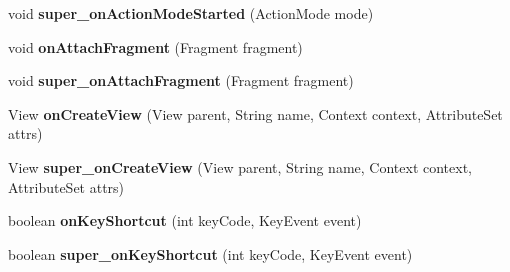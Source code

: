 \begin{DoxyCompactItemize}
\mbox{\label{classorg_1_1qtproject_1_1qt5_1_1android_1_1bindings_1_1_qt_activity_a127cb6e77560fda3f6e3be74982fc85e}} 
void {\bfseries super\+\_\+on\+Action\+Mode\+Started} (Action\+Mode mode)
\item 
\mbox{\label{classorg_1_1qtproject_1_1qt5_1_1android_1_1bindings_1_1_qt_activity_a86beacc61c20b794d08e04df5126ce73}} 
void {\bfseries on\+Attach\+Fragment} (Fragment fragment)
\item 
\mbox{\label{classorg_1_1qtproject_1_1qt5_1_1android_1_1bindings_1_1_qt_activity_a632a2f4f0956a22677fb3c63050295c4}} 
void {\bfseries super\+\_\+on\+Attach\+Fragment} (Fragment fragment)
\item 
\mbox{\label{classorg_1_1qtproject_1_1qt5_1_1android_1_1bindings_1_1_qt_activity_a46b12d20173b9aea5c172e844ace4a70}} 
View {\bfseries on\+Create\+View} (View parent, String name, Context context, Attribute\+Set attrs)
\item 
\mbox{\label{classorg_1_1qtproject_1_1qt5_1_1android_1_1bindings_1_1_qt_activity_a041dac94cc5b7632662d6077fab209b0}} 
View {\bfseries super\+\_\+on\+Create\+View} (View parent, String name, Context context, Attribute\+Set attrs)
\item 
\mbox{\label{classorg_1_1qtproject_1_1qt5_1_1android_1_1bindings_1_1_qt_activity_af5a77708f52a7f1c0158ac9fd0f4e041}} 
boolean {\bfseries on\+Key\+Shortcut} (int key\+Code, Key\+Event event)
\item 
\mbox{\label{classorg_1_1qtproject_1_1qt5_1_1android_1_1bindings_1_1_qt_activity_a40e260363a577baf84c84f0062cda024}} 
boolean {\bfseries super\+\_\+on\+Key\+Shortcut} (int key\+Code, Key\+Event event)
\item 
\mbox{\label{classorg_1_1qtproject_1_1qt5_1_1android_1_1bindings_1_1_qt_activity_a7651b20af8ea1572be803abef7d21e7b}} 

\end{DoxyCompactItemize}
